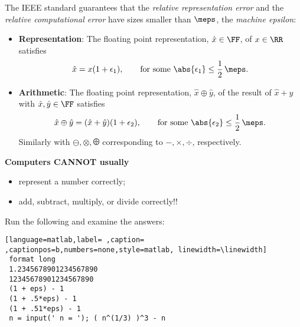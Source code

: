 \documentclass[]{ximera}
\begin{document}
The IEEE standard guarantees that the \emph{relative representation error} and the \emph{relative computational error} have sizes smaller than $\meps$, the \emph{machine epsilon}:
\vs

\begin{itemize}
\item \textbf{Representation}: The floating point representation, $\hat{x} \in \FF$, of $x \in \RR$ satisfies
\[
     \hat{x} = x(1 + \epsilon_1), \qquad \text{for some $\abs{\epsilon_1} \le \frac{1}{2}\,\meps$.}
   \]

\item \textbf{Arithmetic}: The floating point representation, $\hat{x} \oplus \hat{y}$, of the result of $\hat{x} + \hat{y}$ with $\hat{x}, \hat{y} \in \FF$ satisfies
\[
    \hat{x} \oplus \hat{y} = (\hat{x} + \hat{y})(1 + \epsilon_2), \qquad \text{for some $\abs{\epsilon_2} \le \frac{1}{2}\, \meps$.}
  \]
Similarly with $\ominus, \otimes, \odiv$ corresponding to $-, \times, \div$, respectively.
\end{itemize}

\textbf{Computers CANNOT usually}
\begin{itemize}
\item represent a number correctly;
\item add, subtract, multiply, or divide correctly!!
\end{itemize}

Run the following and examine the answers:
\begin{center}
\begin{minipage}[t]{0.8\linewidth}
\begin{lstlisting}[language=matlab,label= ,caption= ,captionpos=b,numbers=none,style=matlab, linewidth=\linewidth]
 format long
 1.2345678901234567890
 12345678901234567890
 (1 + eps) - 1
 (1 + .5*eps) - 1
 (1 + .51*eps) - 1
 n = input(' n = '); ( n^(1/3) )^3 - n
\end{lstlisting}
\end{minipage}
\end{center}
\end{document}
